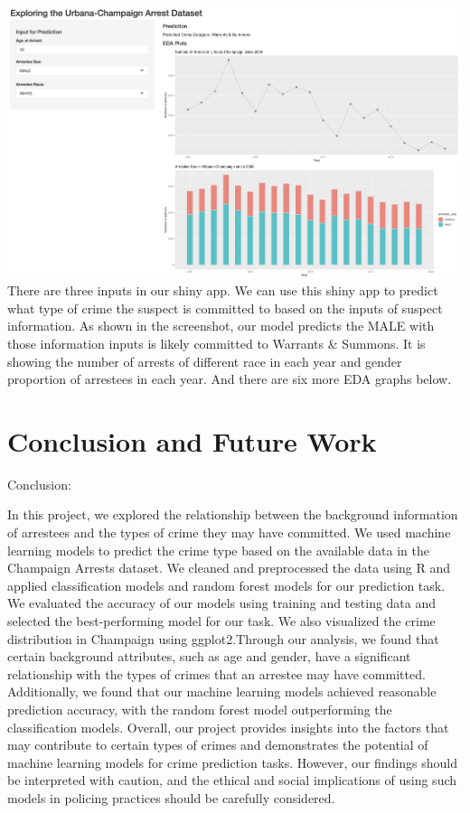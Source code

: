 \documentclass[
  article]{jss}
\begin{document}
\includegraphics{shiny.png} There are three inputs in our shiny app. We
can use this shiny app to predict what type of crime the suspect is
committed to based on the inputs of suspect information. As shown in the
screenshot, our model predicts the MALE with those information inputs is
likely committed to Warrants \& Summons. It is showing the number of
arrests of different race in each year and gender proportion of
arrestees in each year. And there are six more EDA graphs below.

\hypertarget{conclusion-and-future-work}{%
\section{Conclusion and Future Work}\label{conclusion-and-future-work}}

Conclusion:

In this project, we explored the relationship between the background
information of arrestees and the types of crime they may have committed.
We used machine learning models to predict the crime type based on the
available data in the Champaign Arrests dataset. We cleaned and
preprocessed the data using R and applied classification models and
random forest models for our prediction task. We evaluated the accuracy
of our models using training and testing data and selected the
best-performing model for our task. We also visualized the crime
distribution in Champaign using ggplot2.Through our analysis, we found
that certain background attributes, such as age and gender, have a
significant relationship with the types of crimes that an arrestee may
have committed. Additionally, we found that our machine learning models
achieved reasonable prediction accuracy, with the random forest model
outperforming the classification models. Overall, our project provides
insights into the factors that may contribute to certain types of crimes
and demonstrates the potential of machine learning models for crime
prediction tasks. However, our findings should be interpreted with
caution, and the ethical and social implications of using such models in
policing practices should be carefully considered.
\end{document}
